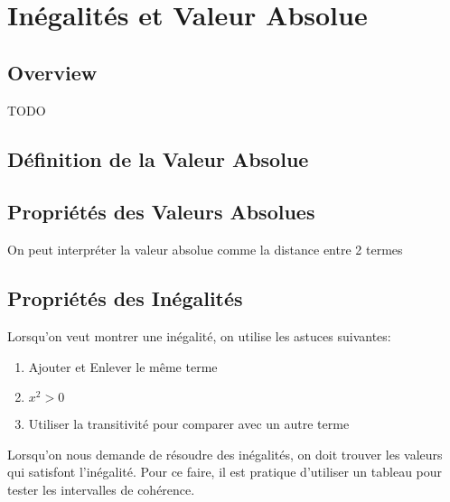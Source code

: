 \documentclass{article}
\begin{document}
\pagebreak

\section{Inégalités et Valeur Absolue}

\subsection{Overview}

TODO

\subsection{Définition de la Valeur Absolue}

\begin{definition}
\end{definition}

\subsection{Propriétés des Valeurs Absolues}

\begin{remark}
    On peut interpréter la valeur absolue comme la distance entre 2 termes
\end{remark}

\subsection{Propriétés des Inégalités}

\begin{problem}
    Lorsqu'on veut montrer une inégalité, on utilise les astuces suivantes:
    \begin{enumerate}
	\item Ajouter et Enlever le même terme
	\item $x^2 > 0$
	\item Utiliser la transitivité pour comparer avec un autre terme
    \end{enumerate}

\end{problem}

\begin{problem}
    Lorsqu'on nous demande de résoudre des inégalités, on doit trouver les
    valeurs qui satisfont l'inégalité. Pour ce faire, il est pratique d'utiliser
    un tableau pour tester les intervalles de cohérence.
\end{problem}
\end{document}
